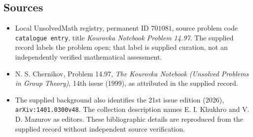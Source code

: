 \documentclass[11pt]{article}
\begin{document}
\subsection{Sources}
\begin{itemize}
\item Local UnsolvedMath registry, permanent ID \(701081\), source problem code \texttt{catalogue entry}, title \emph{Kourovka Notebook Problem 14.97}. The supplied record labels the problem open; that label is supplied curation, not an independently verified mathematical assessment.
\item N. S. Chernikov, Problem 14.97, \emph{The Kourovka Notebook (Unsolved Problems in Group Theory)}, 14th issue (1999), as attributed in the supplied record.
\item The supplied background also identifies the 21st issue edition (2026), \texttt{arXiv:1401.0300v48}. The collection description names E. I. Khukhro and V. D. Mazurov as editors. These bibliographic details are reproduced from the supplied record without independent source verification.
\end{itemize}
\end{document}

